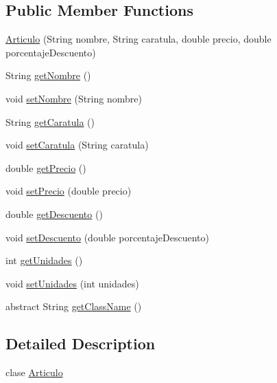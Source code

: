 \subsection*{Public Member Functions}
\begin{DoxyCompactItemize}
\item 
\mbox{\hyperlink{classes_1_1deusto_1_1client_1_1data_1_1_articulo_add5fedbed23b40602c198d346f3f68a1}{Articulo}} (String nombre, String caratula, double precio, double porcentaje\+Descuento)
\item 
String \mbox{\hyperlink{classes_1_1deusto_1_1client_1_1data_1_1_articulo_a7ebce6b5f43d0dc44172c7f77bbb1dfb}{get\+Nombre}} ()
\item 
void \mbox{\hyperlink{classes_1_1deusto_1_1client_1_1data_1_1_articulo_a0ed5b7e6fab4672b372d1a8a670e1c91}{set\+Nombre}} (String nombre)
\item 
String \mbox{\hyperlink{classes_1_1deusto_1_1client_1_1data_1_1_articulo_a74ad4d1bbca96cad0d66403508e90256}{get\+Caratula}} ()
\item 
void \mbox{\hyperlink{classes_1_1deusto_1_1client_1_1data_1_1_articulo_ae1fc25e318b720902e5b3d1c4c654b6b}{set\+Caratula}} (String caratula)
\item 
double \mbox{\hyperlink{classes_1_1deusto_1_1client_1_1data_1_1_articulo_a071f49825a1a7ddfcccc723c634337b0}{get\+Precio}} ()
\item 
void \mbox{\hyperlink{classes_1_1deusto_1_1client_1_1data_1_1_articulo_a81f5428d34c4c3d6b0c3985245c7abea}{set\+Precio}} (double precio)
\item 
double \mbox{\hyperlink{classes_1_1deusto_1_1client_1_1data_1_1_articulo_a6f0a8574b67ff73bab567428d390880d}{get\+Descuento}} ()
\item 
void \mbox{\hyperlink{classes_1_1deusto_1_1client_1_1data_1_1_articulo_a58dcc1870deb6804aa9f9c880fbd0657}{set\+Descuento}} (double porcentaje\+Descuento)
\item 
int \mbox{\hyperlink{classes_1_1deusto_1_1client_1_1data_1_1_articulo_abc6dd64d5c05ad20130a5cf36ccbb9a3}{get\+Unidades}} ()
\item 
void \mbox{\hyperlink{classes_1_1deusto_1_1client_1_1data_1_1_articulo_a924d03bb907e8f1acde9e288a82124d6}{set\+Unidades}} (int unidades)
\item 
abstract String \mbox{\hyperlink{classes_1_1deusto_1_1client_1_1data_1_1_articulo_a7c3b65204c56e1c04afc26e50bc8d301}{get\+Class\+Name}} ()
\end{DoxyCompactItemize}


\subsection{Detailed Description}
clase \mbox{\hyperlink{classes_1_1deusto_1_1client_1_1data_1_1_articulo}{Articulo}} 

